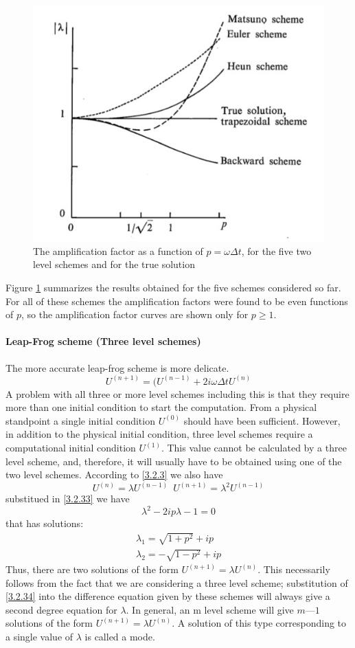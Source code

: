 \begin{figure}[h]
	\centering
	\includegraphics[width=0.50\linewidth]{uploads/Screenshot 2024-11-12 101958.png}
	\caption{The amplification factor as a function of $p=\omega\Delta t$, for the five two level schemes and for the true solution}
	\label{fig:3.2.1}
\end{figure}
Figure \ref{fig:3.2.1} summarizes the results obtained for the five schemes considered so far. For all of these schemes the amplification factors were found to be even functions of $p$, so the amplification factor curves are shown only for $p\geq 1$.
\paragraph{Leap-Frog scheme (Three level schemes)}
The more accurate leap-frog scheme is more delicate.
\begin{equation}\label{3.2.33}
	U^{(n+1)}=(U^{(n-1)}+2i\omega\Delta tU^{(n)}
\end{equation}
A problem with all three or more level schemes including this is that they require more than one initial condition to start the computation. From a physical standpoint a single initial condition $U^{(0)}$ should have been sufficient. However, in addition to the physical initial condition, three level schemes require a computational initial condition $U^{(1)}$. This value cannot be calculated by a three level scheme, and, therefore, it will usually have to be obtained using one of the two level schemes. According to \ref{3.2.3} we also have
\begin{equation}\label{3.2.34}
	U^{(n)}=\lambda U^{(n-1)}\,\,\, U^{(n+1)}=\lambda^2U^{(n-1)}
\end{equation}
substitued in \ref{3.2.33} we have
$$\lambda^2-2ip\lambda-1=0$$ that has solutions:
\begin{align*}
	\lambda_1=\sqrt{1+p^2}+ip \\
	\lambda_2=-\sqrt{1-p^2}+ip
\end{align*}
Thus, there are two solutions of the form $U^{(n+1)}=\lambda U^{(n)}$. This necessarily follows from the fact that we are considering a three level scheme; substitution of \ref{3.2.34} into the difference equation given by these schemes will always give a second degree equation for $\lambda$. In general, an m level scheme will give $m — 1$ solutions of the form $U^{(n+1)}=\lambda U^{(n)}$. A solution of this type corresponding to a single value of $\lambda$ is called a mode.

